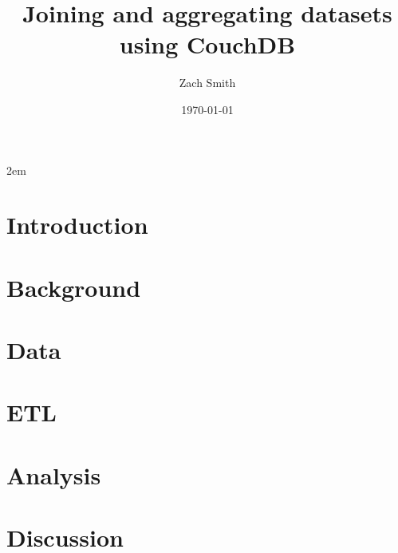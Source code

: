 \documentclass[
    a4paper,
    12pt
]{extreport}
\title{Joining and aggregating datasets using CouchDB}
\author{Zach Smith}
\date{\today}
\begin{document}
\emergencystretch 2em

\maketitle
\thispagestyle{empty}

\begin{abstract}
    
\end{abstract}
\newpage

\tableofcontents
\newpage
\listoffigures
\newpage
\listoftables
\newpage

\chapter{Introduction}


\chapter{Background}






\chapter{Data}
\label{chapter:data}


\chapter{ETL}





\chapter{Analysis}









\chapter{Discussion}



\end{document}
